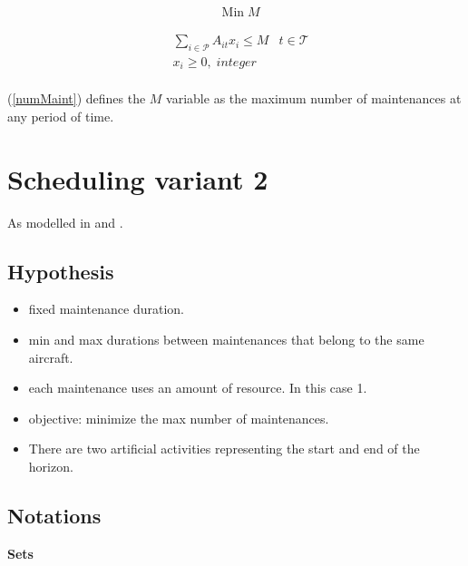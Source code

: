 \documentclass[a4paper,11pt]{article}
\begin{document}
    \begin{align}
        & \text{Min}\; M
    \end{align}

    \begin{align}
        & \sum_{i \in \mathcal{P}} A_{it}x_{i} \leq M & t \in \mathcal{T} \label{numMaint} \\
        & x_{i} \geq 0,\; integer \\
    \end{align}

        (\ref{numMaint}) defines the $M$ variable as the maximum number of maintenances at any period of time.


\clearpage

\section{Scheduling variant 2}

    As modelled in \cite{Rieck2012} and \cite{Neumann2000}.

    \subsection{Hypothesis}

    \begin{itemize}
     \item fixed maintenance duration.
     \item min and max durations between maintenances that belong to the same aircraft.
     \item each maintenance uses an amount of resource. In this case 1.
     \item objective: minimize the max number of maintenances.
     \item There are two artificial activities representing the start and end of the horizon.
    \end{itemize}

    \subsection{Notations}

    \textbf{Sets}

\end{document}

